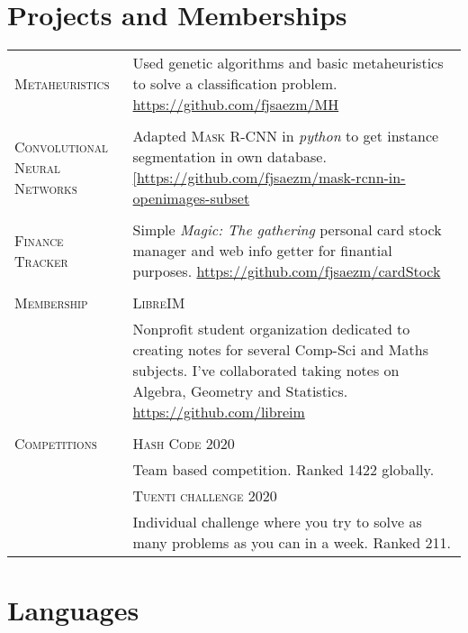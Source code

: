 \documentclass[a4paper,11pt]{article} %
\begin{document}
\section{Projects and Memberships}

\begin{tabular}{p{3cm}|p{11cm}}
  \textsc{Metaheuristics} & Used genetic algorithms and basic metaheuristics to solve a classification problem. \href{https://github.com/fjsaezm/MH}{https://github.com/fjsaezm/MH}\\ \\

  \textsc{Convolutional Neural Networks} & Adapted \textsc{Mask R-CNN} in \emph{python} to get instance segmentation in own database. \href{[https://github.com/fjsaezm/mask-rcnn-in-openimages-subset}{[https://github.com/fjsaezm/mask-rcnn-in-openimages-subset}\\ \\

      \textsc{Finance Tracker} & Simple \emph{Magic: The  gathering} personal card stock manager and web info getter for finantial purposes. \href{https://github.com/fjsaezm/cardStock}{https://github.com/fjsaezm/cardStock}\\ \\

      \textsc{Membership} & \textsc{LibreIM} \\
      & Nonprofit student organization dedicated to creating notes for several Comp-Sci and Maths subjects. I've collaborated taking notes on Algebra, Geometry and Statistics.
    \href{https://github.com/libreim}{https://github.com/libreim}\\ \\


    \textsc{Competitions} & \textsc{Hash Code 2020} \\ 
    & Team based competition. Ranked 1422 globally. \\ 
    & \textsc{Tuenti challenge 2020} \\ 
    & Individual challenge where you try to solve as many problems as you can in a week. Ranked 211.

\end{tabular}


\section{Languages}
\end{document}
